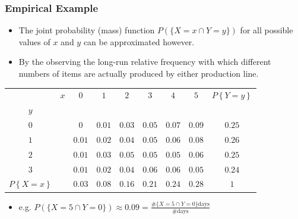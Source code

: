 \documentclass[notes=show,handout]{beamer}
\newenvironment{stepitemize}{\begin{itemize}[<+->]}{\end{itemize} }
\renewcommand{\Pr}{P}
\begin{document}
\begin{frame}%

\frametitle{Empirical Example}

\begin{example}

\begin{stepitemize}
\item The joint probability (mass) function $\Pr(\{X=x\cap Y=y\})$ for all
possible values of $x$ and $y$ can be approximated however.

\item By the observing the long-run relative frequency with which different
numbers of items are actually produced by either production line.
\end{stepitemize}

\begin{tabular}{|cc||c|c|c|c|c|c||c|}
\hline
& $x$ & $0$ & $1$ & $2$ & $3$ & $4$ & $5$ & $\Pr \left\{ Y=y\right\} $ \\ 
$y$ &  &  &  &  &  &  &  &  \\ \hline\hline
$0$ &  & $0$ & $0.01$ & $0.03$ & $0.05$ & $0.07$ & $0.09$ & $0.25$ \\ \hline
$1$ &  & $0.01$ & $0.02$ & $0.04$ & $0.05$ & $0.06$ & $0.08$ & $0.26$ \\ 
\hline
$2$ &  & $0.01$ & $0.03$ & $0.05$ & $0.05$ & $0.05$ & $0.06$ & $0.25$ \\ 
\hline
$3$ &  & $0.01$ & $0.02$ & $0.04$ & $0.06$ & $0.06$ & $0.05$ & $0.24$ \\ 
\hline\hline
$\Pr \left\{ X=x\right\} $ &  & $0.03$ & $0.08$ & $0.16$ & $0.21$ & $0.24$ & 
$0.28$ & $1$ \\ \hline
\end{tabular}

\begin{stepitemize}

\item e.g. $\Pr(\{X=5\cap Y=0\})\approx 0.09=\frac{\#\{X=5\cap Y=0\}\text{days}%
}{\#\text{days}}$ 
\end{stepitemize}
\end{example}

\end{frame}%
\end{document}
